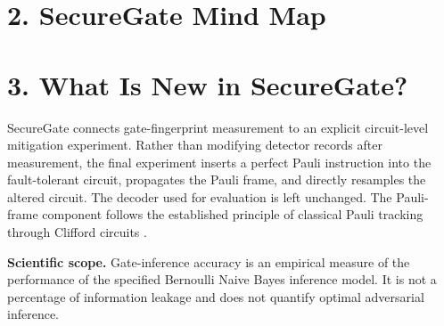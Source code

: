 \documentclass[9pt,a4paper]{article}
\newcommand{\LER}{\ensuremath{\mathrm{LER}}}
\begin{document}
\section*{2. SecureGate Mind Map}
\begin{center}
\end{center}

\section*{3. What Is New in SecureGate?}
SecureGate connects gate-fingerprint measurement to an explicit circuit-level mitigation experiment. Rather than modifying detector records after measurement, the final experiment inserts a perfect Pauli instruction into the fault-tolerant circuit, propagates the Pauli frame, and directly resamples the altered circuit. The decoder used for evaluation is left unchanged. The Pauli-frame component follows the established principle of classical Pauli tracking through Clifford circuits \cite{reichardt2006}.

\begin{boxg}
\textbf{Scientific scope.} Gate-inference accuracy is an empirical measure of the performance of the specified Bernoulli Naive Bayes inference model. It is not a percentage of information leakage and does not quantify optimal adversarial inference.
\end{boxg}
\end{document}
